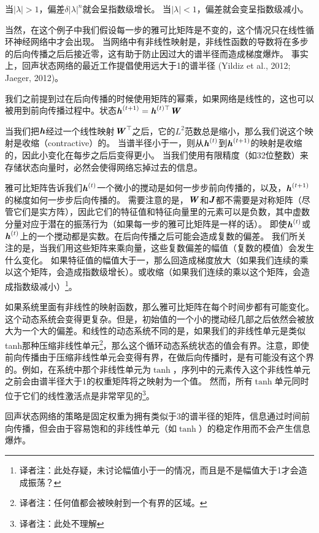 当$ | \lambda | > 1$，偏差$\delta | \lambda |^n$就会呈指数级增长。
当$ | \lambda | < 1$，偏差就会变呈指数级减小。

当然，在这个例子中我们假设每一步的雅可比矩阵是不变的，这个情况只在线性循环神经网络中才会出现。
当网络中有非线性映射是，非线性函数的导数将在多步的后向传播之后后接近零，这有助于防止因过大的谱半径而造成梯度爆炸。
事实上，回声状态网络的最近工作提倡使用远大于1的谱半径 (Yildiz et al., 2012; Jaeger, 2012)。

我们之前提到过在后向传播的时候使用矩阵的幂乘，如果网络是线性的，这也可以被用到前向传播过程中。状态$\boldsymbol{\mathit{h}}^{(t+1)} = \boldsymbol{\mathit{h}}^{(t)\top} \boldsymbol{\mathit{W}} $

当我们把$\boldsymbol{\mathit{h}}$经过一个线性映射$\boldsymbol{\mathit{W}}^\top$之后，它的$L^2$范数总是缩小，那么我们说这个映射是收缩（contractive）的。
当谱半径小于一，则从$\boldsymbol{\mathit{h}}^{(t)}$到$\boldsymbol{\mathit{h}}^{(t+1)}$的映射是收缩的，因此小变化在每步之后后变得更小。
当我们使用有限精度（如32位整数）来存储状态向量时，必然会使得网络忘掉过去的信息。

雅可比矩阵告诉我们$\boldsymbol{\mathit{h}}^{(t)}$一个微小的搅动是如何一步步前向传播的，以及，$\boldsymbol{\mathit{h}}^{(t+1)}$的梯度如何一步步后向传播的。
需要注意的是，$\boldsymbol{\mathit{W}}$和$\boldsymbol{\mathit{J}}$都不需要是对称矩阵（尽管它们是实方阵），因此它们的特征值和特征向量里的元素可以是负数，其中虚数分量对应于潜在的振荡行为（如果每一步的雅可比矩阵是一样的话）。
即使$\boldsymbol{\mathit{h}}^{(t)}$或$\boldsymbol{\mathit{h}}^{(t)}$上的一个搅动都是实数。在后向传播之后可能会造成复数的偏差。
我们所关注的是，当我们用这些矩阵来乘向量，这些复数偏差的幅值（复数的模值）会发生什么变化。
如果特征值的幅值大于一，那么回造成梯度放大（如果我们连续的乘以这个矩阵，会造成指数级增长）。或收缩（如果我们连续的乘以这个矩阵，会造成指数级减小）\footnote{译者注：此处存疑，未讨论幅值小于一的情况，而且是不是幅值大于1才会造成振荡？}。

如果系统里面有非线性的映射函数，那么雅可比矩阵在每个时间步都有可能变化。这个动态系统会变得更复杂。但是，初始值的一个小的搅动经几部之后依然会被放大为一个大的偏差。和线性的动态系统不同的是，如果我们的非线性单元是类似tanh那种压缩非线性单元\footnote{译者注：任何值都会被映射到一个有界的区域。}，那么这个循环动态系统状态的值会有界。注意，即使前向传播由于压缩非线性单元会变得有界，在做后向传播时，是有可能没有这个界的。例如，在系统中那个非线性单元为$\tanh$，序列中的元素传入这个非线性单元之前会由谱半径大于1的权重矩阵将之映射为一个值。
然而，所有$\tanh$单元同时位于它们的线性激活点是非常罕见的\footnote{译者注：此处不理解}。

回声状态网络的策略是固定权重为拥有类似于3的谱半径的矩阵，信息通过时间前向传播，但会由于容易饱和的非线性单元（如$\tanh$）的稳定作用而不会产生信息爆炸。

